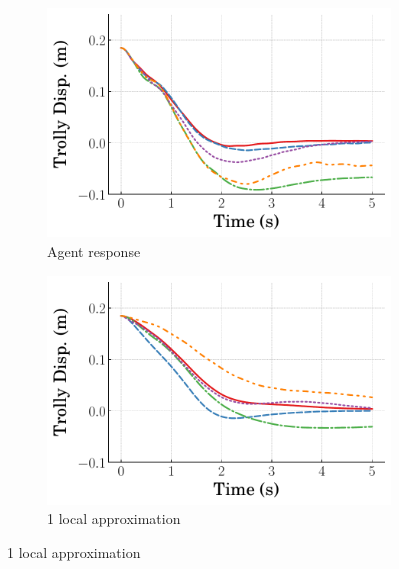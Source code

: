 %
\begin{figure}
    \centering
    \begin{subfigure}[b]{0.32\textwidth}
        \centering
        \includegraphics[width=\textwidth]{figures/figures_Interpretability/Mean_ISE_dpcrane_cubic_1_bins/curve_fit_time_responses/pure_RL/agent_0p18_Trolly_Disp.pdf}
        \caption{Agent response}
        \label{subfig_chap5:dpcrane_pure_RL_trolley_0.185_init_agent_unclipped}
    \end{subfigure}
    \hfill
    \begin{subfigure}[b]{0.32\textwidth}
        \centering
        \includegraphics[width=\textwidth]{figures/figures_Interpretability/Mean_ISE_dpcrane_cubic_1_bins/curve_fit_time_responses/pure_RL/curve_fit_0p18_Trolly_Disp.pdf}
        \caption{1 local approximation}
        \label{subfig_chap5:dpcrane_pure_RL_trolley_0.185_init_curve_fit_1_bins_unclipped}

\end{subfigure}
\end{figure}
